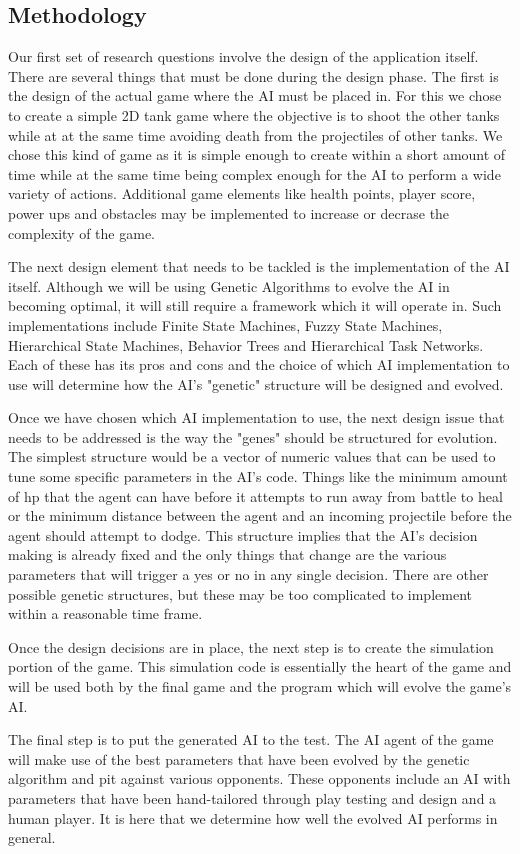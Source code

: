 \subsection*{Methodology}
Our first set of research questions involve the design of the application itself.
There are several things that must be done during the design phase. The first is
the design of the actual game where the AI must be placed in. For this we chose to
create a simple 2D tank game where the objective is to shoot the other tanks
while at at the same time avoiding death from the projectiles of other tanks. We
chose this kind of game as it is simple enough to create within a short amount of time
while at the same time being complex enough for the AI to perform a wide variety of
actions. Additional game elements like health points, player score, power ups and
obstacles may be implemented to increase or decrase the complexity of the game.


The next design element that needs to be tackled is the implementation of the AI itself.
Although we will be using Genetic Algorithms to evolve the AI in becoming optimal, it
will still require a framework which it will operate in. Such implementations include
Finite State Machines, Fuzzy State Machines, Hierarchical State Machines, Behavior Trees
and Hierarchical Task Networks. Each of these has its pros and cons and the choice of
which AI implementation to use will determine how the AI's "genetic" structure will be
designed and evolved.


Once we have chosen which AI implementation to use, the next design issue that needs to
be addressed is the way the "genes" should be structured for evolution. The simplest
structure would be a vector of numeric values that can be used to tune some specific
parameters in the AI's code. Things like the minimum amount of hp that the agent can have
before it attempts to run away from battle to heal or the minimum distance between the
agent and an incoming projectile before the agent should attempt to dodge. This structure
implies that the AI's decision making is already fixed and the only things that change
are the various parameters that will trigger a yes or no in any single decision. There
are other possible genetic structures, but these may be too complicated to implement
within a reasonable time frame.


Once the design decisions are in place, the next step is to create the simulation portion
of the game. This simulation code is essentially the heart of the game and will be used
both by the final game and the program which will evolve the game's AI.


The final step is to put the generated AI to the test. The AI agent of the game will make
use of the best parameters that have been evolved by the genetic algorithm and pit against
various opponents. These opponents include an AI with parameters that have been hand-tailored
through play testing and design and a human player. It is here that we determine how well
the evolved AI performs in general.